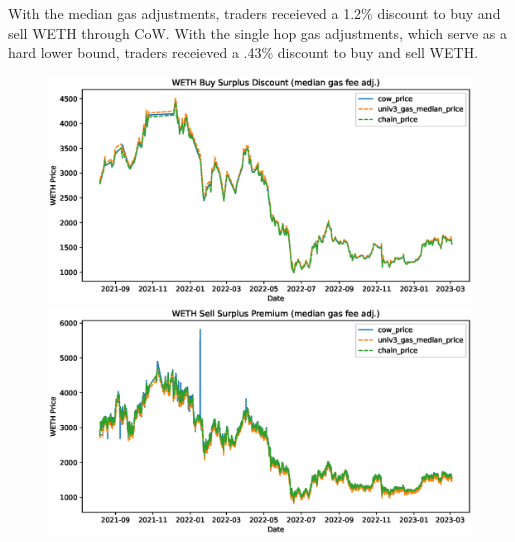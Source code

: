 \documentclass[a4paper,10pt]{article}
\theoremstyle{remark}
\begin{document}
With the median gas adjustments, traders receieved a 1.2\% discount to buy and sell WETH through CoW.
With the single hop gas adjustments, which serve as a hard lower bound, traders receieved a .43\% discount to buy and sell WETH.

\begin{figure}
  \begin{center}
    \begin{minipage}{.5\textwidth}
      \begin{center}
        \includegraphics[width=.9\textwidth]
          {diagrams/WETH_buy_surplus_discount_median_gas_fee_adj.eps}
      \end{center}
   \end{minipage}%
    \begin{minipage}{.5\textwidth}
      \begin{center}
        \includegraphics[width=.9\textwidth]
          {diagrams/WETH_sell_surplus_premium_median_gas_fee_adj.eps}
      \end{center}
    \end{minipage}
  \end{center}
\end{figure}

\end{document}
